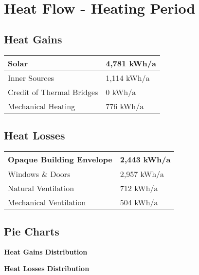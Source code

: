 \documentclass{article}
\begin{document}
\vspace{1cm}

\section*{Heat Flow - Heating Period}

\subsection*{Heat Gains}

\begin{tabular}{|l|l|}
    \hline
    Solar & 4,781 kWh/a \\
    \hline
    Inner Sources & 1,114 kWh/a \\
    \hline
    Credit of Thermal Bridges & 0 kWh/a \\
    \hline
    Mechanical Heating & 776 kWh/a \\
    \hline
\end{tabular}

\vspace{1cm}

\subsection*{Heat Losses}

\begin{tabular}{|l|l|}
    \hline
    Opaque Building Envelope & 2,443 kWh/a \\
    \hline
    Windows \& Doors & 2,957 kWh/a \\
    \hline
    Natural Ventilation & 712 kWh/a \\
    \hline
    Mechanical Ventilation & 504 kWh/a \\
    \hline
\end{tabular}

\vspace{1cm}

\subsection*{Pie Charts}

\begin{minipage}{0.45\textwidth}
    \centering
    \textbf{Heat Gains Distribution}
\end{minipage}
\hspace{1cm}
\begin{minipage}{0.45\textwidth}
    \centering
    \textbf{Heat Losses Distribution}
\end{minipage}
\end{document}
